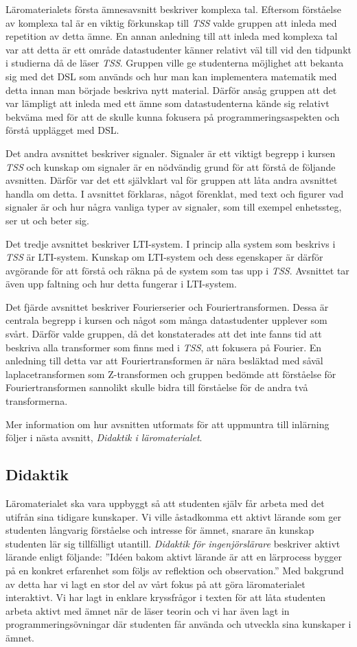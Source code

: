 \documentclass[]{article}
\begin{document}
Läromaterialets första ämnesavsnitt beskriver komplexa tal. Eftersom förståelse av komplexa tal är en viktig förkunskap
till \textit{TSS} valde gruppen att inleda med repetition av detta ämne. En annan anledning till att inleda med komplexa
tal var att detta är ett område datastudenter känner relativt väl till vid den tidpunkt i studierna då de läser
\textit{TSS}. Gruppen ville ge studenterna möjlighet att bekanta sig med det DSL som används och hur man kan
implementera matematik med detta innan man började beskriva nytt material. Därför ansåg gruppen att det var lämpligt att
inleda med ett ämne som datastudenterna kände sig relativt bekväma med för att de skulle kunna fokusera på
programmeringsaspekten och förstå upplägget med DSL.

Det andra avsnittet beskriver signaler. Signaler är ett viktigt begrepp i kursen \textit{TSS} och kunskap om signaler är
en nödvändig grund för att förstå de följande avsnitten. Därför var det ett självklart val för gruppen att låta andra
avsnittet handla om detta. I avsnittet förklaras, något förenklat, med text och figurer vad signaler är och hur några
vanliga typer av signaler, som till exempel enhetssteg, ser ut och beter sig.

Det tredje avsnittet beskriver LTI-system. I princip alla system som beskrivs i \textit{TSS} är LTI-system. Kunskap om LTI-system
och dess egenskaper är därför avgörande för att förstå och räkna på de system som tas upp i \textit{TSS}. Avsnittet tar
även upp faltning och hur detta fungerar i LTI-system.

Det fjärde avsnittet beskriver Fourierserier och Fouriertransformen. Dessa är centrala begrepp i kursen och något som
många datastudenter upplever som svårt. Därför valde gruppen, då det konstaterades att det inte fanns tid att beskriva
alla transformer som finns med i \textit{TSS}, att fokusera på Fourier. En anledning till detta var att Fouriertransformen är nära besläktad med
såväl laplacetransformen som Z-transformen och gruppen bedömde att förståelse för Fouriertransformen sannolikt skulle
bidra till förståelse för de andra två transformerna.

Mer information om hur avsnitten utformats för att uppmuntra till inlärning följer i nästa avsnitt,
\textit{Didaktik i läromaterialet}.

\subsection{Didaktik}
Läromaterialet ska vara uppbyggt så att studenten själv får arbeta med det utifrån sina tidigare
kunskaper. Vi ville åstadkomma ett aktivt lärande som ger studenten långvarig förståelse och
intresse för ämnet, snarare än kunskap studenten lär sig tillfälligt utantill. \textit{Didaktik för
ingenjörslärare} beskriver aktivt lärande enligt följande: ”Idéen bakom aktivt lärande är att en
lärprocess bygger på en konkret erfarenhet som följs av reflektion och observation.” Med bakgrund av
detta har vi lagt en stor del av vårt fokus på att göra läromaterialet interaktivt. Vi har lagt in
enklare kryssfrågor i texten för att låta studenten arbeta aktivt med ämnet när de läser teorin och
vi har även lagt in programmeringsövningar där studenten får använda och utveckla sina kunskaper i
ämnet.
\end{document}
